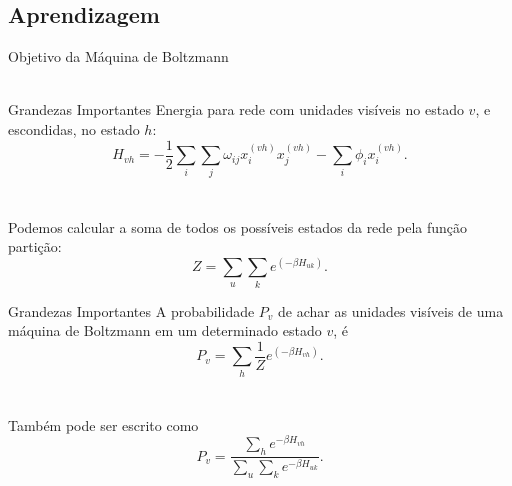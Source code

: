 \subsection{Aprendizagem}%
\begin{frame}{Objetivo da Máquina de Boltzmann}%
  \justifying%
  \\~\\
\end{frame}

\begin{frame}{Grandezas Importantes}%
  \justifying%
  Energia para rede com unidades visíveis no estado $v$, e escondidas, no estado $h$:
  \begin{equation}%
    \label{eq:bm-energy}
    H_{vh} = -\frac{1}{2} \sum_{i} \sum_{j} \omega_{ij} x^{(vh)}_{i} x^{(vh)}_{j} - \sum_{i} \phi_{i} x^{(vh)}_{i}.
  \end{equation}
  \\~\\
  Podemos calcular a soma de todos os possíveis estados da rede pela função partição:
  \begin{equation}%
    \label{eq:bm-partition}
    Z = \sum_{u} \sum_{k} e^{(-\beta H_{uk})}.
  \end{equation}
\end{frame}

\begin{frame}{Grandezas Importantes}%
  A probabilidade $P_{v}$ de achar as unidades visíveis de uma máquina de Boltzmann em um determinado estado $v$, é
  \begin{equation}%
    \label{eq:bm-prob-marg}%
    P_{v} = \sum_{h} \frac{1}{Z} e^{(-\beta H_{vh})}.
  \end{equation}
  \\~\\
  Também pode ser escrito como
  \begin{equation}%
    \label{eq:bm-prob-marg2}
    P_{v} = \frac{\sum_{h} e^{-\beta H_{vh}}}{\sum_{u} \sum_{k} e^{-\beta H_{uk}}}.
  \end{equation}
\end{frame}

